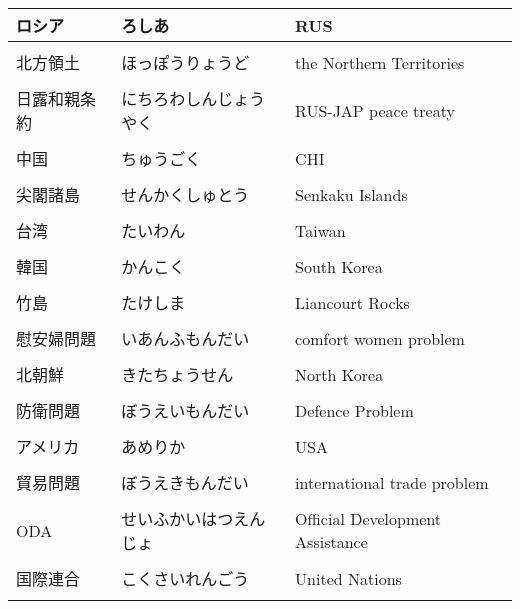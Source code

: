 \documentclass{article}
\begin{document}
\begin{tabular}{  l | l | p{5cm} }
 ロシア					& ろしあ				& RUS	\\ \hline \\[-1em]
 北方領土					& ほっぽうりょうど 		& the Northern Territories\\ \hline \\[-1em]
 日露和親条約				& にちろわしんじょうやく		& RUS-JAP peace treaty\\ \hline \\[-1em]
 中国					& ちゅうごく				& CHI \\ \hline \\[-1em]
 尖閣諸島					& せんかくしゅとう			& Senkaku Islands　\\ \hline \\[-1em]
 台湾					& たいわん				& Taiwan \\ \hline \\[-1em]
 韓国					& かんこく 				& South Korea\\ \hline \\[-1em]
 竹島					& たけしま				& Liancourt Rocks \\ \hline \\[-1em]
 慰安婦問題				& いあんふもんだい		& comfort women problem\\ \hline \\[-1em]
 北朝鮮					& きたちょうせん			& North Korea \\ \hline \\[-1em]
 防衛問題					& ぼうえいもんだい		& Defence Problem \\ \hline \\[-1em]
 アメリカ					& あめりか				& USA	 \\ \hline \\[-1em]
 貿易問題					& ぼうえきもんだい		& international trade problem\\ \hline \\[-1em]
 ODA				&せいふかいはつえんじょ  &Official Development Assistance \\ \hline \\[-1em]
 国際連合					& こくさいれんごう 		& United Nations \\ \hline \\[-1em]
    \end{tabular}
\end{document}
